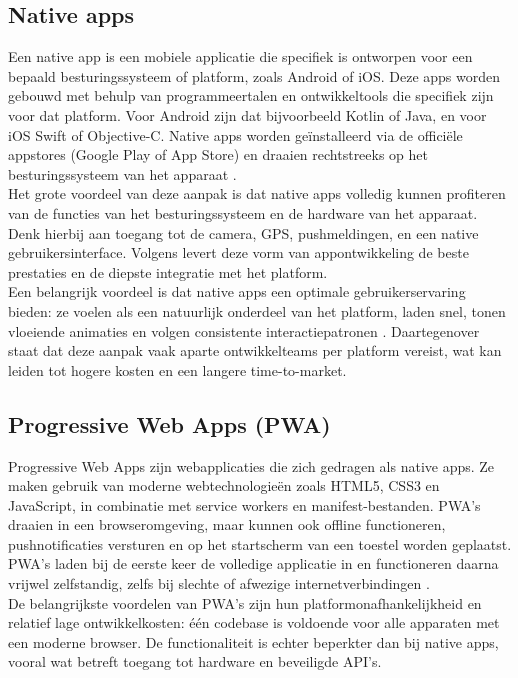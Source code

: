 \subsection{Native apps}
Een native app is een mobiele applicatie die specifiek is ontworpen voor een bepaald besturingssysteem of platform, zoals Android of iOS. Deze apps worden gebouwd met behulp van programmeertalen en ontwikkeltools die specifiek zijn voor dat platform. Voor Android zijn dat bijvoorbeeld Kotlin of Java, en voor iOS Swift of Objective-C. Native apps worden geïnstalleerd via de officiële appstores (Google Play of App Store) en draaien rechtstreeks op het besturingssysteem van het apparaat \autocite{Singh2024}.\\

Het grote voordeel van deze aanpak is dat native apps volledig kunnen profiteren van de functies van het besturingssysteem en de hardware van het apparaat. Denk hierbij aan toegang tot de camera, GPS, pushmeldingen, en een native gebruikersinterface. Volgens \textcite{Gillis2022} levert deze vorm van appontwikkeling de beste prestaties en de diepste integratie met het platform.\\

Een belangrijk voordeel is dat native apps een optimale gebruikerservaring bieden: ze voelen als een natuurlijk onderdeel van het platform, laden snel, tonen vloeiende animaties en volgen consistente interactiepatronen \autocite{Gillis2022}. Daartegenover staat dat deze aanpak vaak aparte ontwikkelteams per platform vereist, wat kan leiden tot hogere kosten en een langere time-to-market.

\subsection{Progressive Web Apps (PWA)}  
Progressive Web Apps zijn webapplicaties die zich gedragen als native apps. Ze maken gebruik van moderne webtechnologieën zoals HTML5, CSS3 en JavaScript, in combinatie met service workers en manifest-bestanden. PWA’s draaien in een browseromgeving, maar kunnen ook offline functioneren, pushnotificaties versturen en op het startscherm van een toestel worden geplaatst. PWA’s laden bij de eerste keer de volledige applicatie in en functioneren daarna vrijwel zelfstandig, zelfs bij slechte of afwezige internetverbindingen \autocite{Hendriksen2020}.\\

De belangrijkste voordelen van PWA’s zijn hun platformonafhankelijkheid en relatief lage ontwikkelkosten: één codebase is voldoende voor alle apparaten met een moderne browser. De functionaliteit is echter beperkter dan bij native apps, vooral wat betreft toegang tot hardware en beveiligde API’s.\\  

